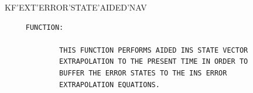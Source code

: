 \begin{frame}
KF'EXT'ERROR'STATE'AIDED'NAV
\begin{verbatim}
     FUNCTION:

             THIS FUNCTION PERFORMS AIDED INS STATE VECTOR
             EXTRAPOLATION TO THE PRESENT TIME IN ORDER TO
             BUFFER THE ERROR STATES TO THE INS ERROR
             EXTRAPOLATION EQUATIONS.

\end{verbatim}
\end{frame}
